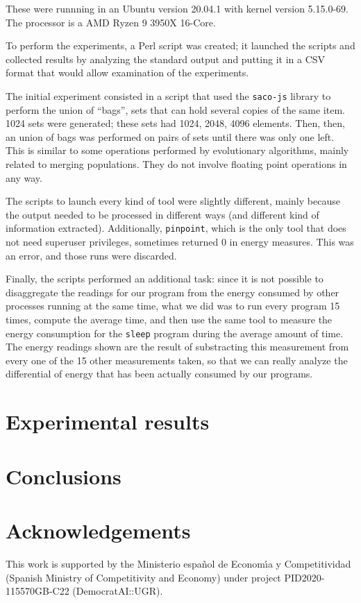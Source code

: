 \documentclass[a4paper,twoside]{article}
\begin{document}
These were runnning in an Ubuntu version 20.04.1 with kernel version
5.15.0-69. The processor is a AMD Ryzen 9 3950X 16-Core.

To perform the experiments, a Perl script was created; it launched the scripts
and collected results by analyzing the standard output and putting it in a CSV
format that would allow examination of the experiments.

The initial experiment consisted in a script that used the \texttt{saco-js}
library to perform the union of ``bags'', sets that can hold several copies of
the same item. 1024 sets were generated; these sets had 1024, 2048, 4096
elements. Then, then, an union of bags was performed on pairs of sets until
there was only one left. This is similar to some operations performed by
evolutionary algorithms, mainly related to merging populations. They do not
involve floating point operations in any way.

The scripts to launch every kind of tool were slightly different, mainly because
the output needed to be processed in different ways (and different kind of
information extracted). Additionally, \texttt{pinpoint}, which is the only tool
that does not need superuser privileges, sometimes returned 0 in energy
measures. This was an error, and those runs were discarded.

Finally, the scripts performed an additional task: since it is not possible to
disaggregate the readings for our program from the energy consumed by other
processes running at the same time, what we did was to run every program 15
times, compute the average time, and then use the same tool to measure the
energy consumption for the \texttt{sleep} program during the average amount of
time. The energy readings shown are the result of substracting this measurement
from every one of the 15 other measurements taken, so that we can really analyze
the differential of energy that has been actually consumed by our programs.


\section{Experimental results}
\label{sec:res}

\section{Conclusions}
\label{sec:conc}

\section*{Acknowledgements}

This work is supported by the Ministerio espa\~{n}ol de Econom\'{\i}a y
Competitividad (Spanish Ministry of Competitivity and Economy) under project
PID2020-115570GB-C22 (DemocratAI::UGR).



{\small
}
\end{document}
